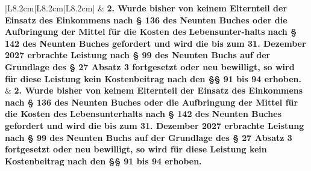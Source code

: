 \documentclass[10pt,a4paper,landscape]{article}
\begin{document}
\begin{longtable}{|L{8.2cm}|L{8.2cm}|L{8.2cm}|}
 & \textbf{2.   \newline Wurde bisher von keinem Elternteil der  \newline Einsatz des Einkommens nach \S{} 136  \newline des Neunten Buches oder die  \newline Aufbringung der Mittel für die Kosten  \newline des }\textbf{\textcolor{diffred}{Lebensunter-halts}}\textbf{ nach \S{} 142 des  \newline Neunten Buches gefordert und wird die  \newline bis zum 31. Dezember 2027 erbrachte  \newline Leistung nach \S{} 99 des Neunten Buchs  \newline auf der Grundlage des \S{} 27 Absatz 3  \newline fortgesetzt oder neu bewilligt, so wird  \newline für diese Leistung kein Kostenbeitrag  \newline nach den \S{}\S{} 91 bis 94 erhoben. } & \textbf{2.   \newline Wurde bisher von keinem Elternteil der  \newline Einsatz des Einkommens nach \S{} 136  \newline des Neunten Buches oder die  \newline Aufbringung der Mittel für die Kosten  \newline des }\textbf{\textcolor{diffgreen}{Lebensunterhalts}}\textbf{ nach \S{} 142 des  \newline Neunten Buches gefordert und wird die  \newline bis zum 31. Dezember 2027 erbrachte  \newline Leistung nach \S{} 99 des Neunten Buchs  \newline auf der Grundlage des \S{} 27 Absatz 3  \newline fortgesetzt oder neu bewilligt, so wird  \newline für diese Leistung kein Kostenbeitrag  \newline nach den \S{}\S{} 91 bis 94 erhoben. } \\
\hhline{|---|}

\end{longtable}
\end{document}
